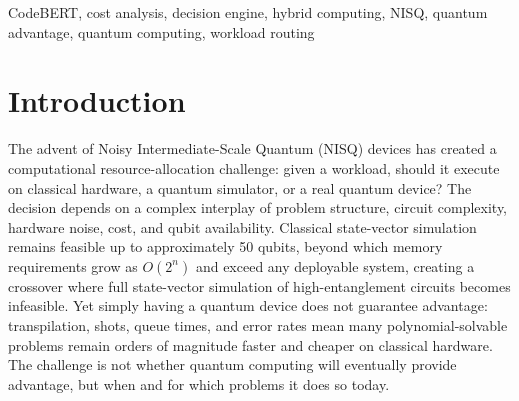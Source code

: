 \documentclass[10pt,conference]{IEEEtran}
\begin{document}
\maketitle

\begin{abstract}
Determining whether a workload benefits from quantum or classical execution remains a key open challenge in the NISQ era. We present Nexar, a routing platform that analyzes source code, automatically extracts workload features, and recommends an execution target that jointly optimizes cost and runtime. Nexar pairs a physics-aware rule engine for clear-cut cases: workloads with no quantum structure, and workloads too large for classical simulation, with a weighted ensemble of machine learning, rules, and cost analysis that handles the ambiguous mid-scale regime where rules defer. Feature extraction is automated using CodeBERT-based algorithm classification and quantum circuit characterization. Across a benchmark spanning search, factorization, optimization, and simulation workloads, Nexar achieves meaningful agreement with independently-grounded oracles for algorithmic advantage and hardware viability, substantially outperforming random, cost-only, and rule-only baselines on the Quantum-class recovery metrics that matter for this imbalanced benchmark. Routing decisions are further validated end-to-end on IBM superconducting hardware, including a large-qubit variational circuit, demonstrating that Nexar's recommendations execute successfully on production quantum devices even where noise dominates output fidelity absent error mitigation.
\end{abstract}

\begin{IEEEkeywords}
CodeBERT, cost analysis, decision engine, hybrid computing, NISQ, quantum advantage, quantum computing, workload routing
\end{IEEEkeywords}

\section{Introduction}

The advent of Noisy Intermediate-Scale Quantum (NISQ) devices \cite{preskill2018} has created a computational resource-allocation challenge: given a workload, should it execute on classical hardware, a quantum simulator, or a real quantum device? The decision depends on a complex interplay of problem structure, circuit complexity, hardware noise, cost, and qubit availability. Classical state-vector simulation remains feasible up to approximately 50 qubits, beyond which memory requirements grow as $O(2^n)$ and exceed any deployable system, creating a crossover where full state-vector simulation of high-entanglement circuits becomes infeasible. Yet simply having a quantum device does not guarantee advantage: transpilation, shots, queue times, and error rates mean many polynomial-solvable problems remain orders of magnitude faster and cheaper on classical hardware. The challenge is not whether quantum computing will eventually provide advantage, but when and for which problems it does so today.
\end{document}
